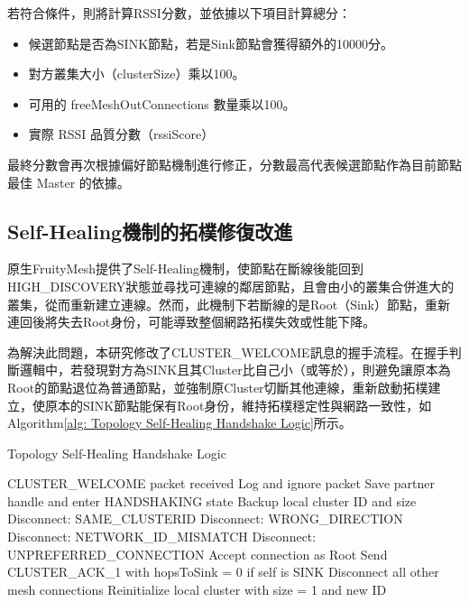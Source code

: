 \begin{ZhChapter}
若符合條件，則將計算RSSI分數，並依據以下項目計算總分：

\begin{itemize}
    \item 候選節點是否為SINK節點，若是Sink節點會獲得額外的10000分。
    \item 對方叢集大小（clusterSize）乘以100。
    \item 可用的 freeMeshOutConnections 數量乘以100。
    \item 實際 RSSI 品質分數（rssiScore）
\end{itemize}

最終分數會再次根據偏好節點機制進行修正，分數最高代表候選節點作為目前節點最佳 Master 的依據。


\subsection{Self-Healing機制的拓樸修復改進}

原生FruityMesh提供了Self-Healing機制，使節點在斷線後能回到HIGH\_DISCOVERY狀態並尋找可連線的鄰居節點，且會由小的叢集合併進大的叢集，從而重新建立連線。然而，此機制下若斷線的是Root（Sink）節點，重新連回後將失去Root身份，可能導致整個網路拓樸失效或性能下降。

為解決此問題，本研究修改了CLUSTER\_WELCOME訊息的握手流程。在握手判斷邏輯中，若發現對方為SINK且其Cluster比自己小（或等於），則避免讓原本為Root的節點退位為普通節點，並強制原Cluster切斷其他連線，重新啟動拓樸建立，使原本的SINK節點能保有Root身份，維持拓樸穩定性與網路一致性，如Algorithm\ref{alg: Topology Self-Healing Handshake Logic}所示。

\begin{algorithm}[H]
\caption{Topology Self-Healing Handshake Logic}
\label{alg: Topology Self-Healing Handshake Logic}
\begin{algorithmic}[1]
\Require CLUSTER\_WELCOME packet received
    \State Log and ignore packet
\Else
    \State Save partner handle and enter HANDSHAKING state
    \State Backup local cluster ID and size
        \State Disconnect: SAME\_CLUSTERID
            \State Disconnect: WRONG\_DIRECTION
        \EndIf
        \State Disconnect: NETWORK\_ID\_MISMATCH
        \State Disconnect: UNPREFERRED\_CONNECTION
    \Else
        \State Accept connection as Root
        \State Send CLUSTER\_ACK\_1 with hopsToSink = 0 if self is SINK
        \State Disconnect all other mesh connections
        \State Reinitialize local cluster with size = 1 and new ID
    \EndIf
\EndIf
\end{algorithmic}
\end{algorithm}


\end{ZhChapter}
